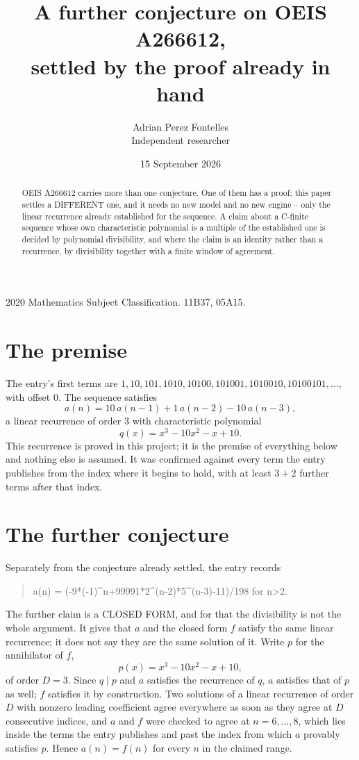 \documentclass[11pt,a4paper]{article}
\title{A further conjecture on OEIS A266612,\\ \large settled by the proof already in hand}
\author{Adrian Perez Fontelles\\ \small Independent researcher}
\date{15 September 2026}
\theoremstyle{plain}
\theoremstyle{definition}
\begin{document}
\maketitle

\begin{abstract}
OEIS A266612 carries more than one conjecture. One of them has a proof; this paper settles a
DIFFERENT one, and it needs no new model and no new engine -- only the linear recurrence already
established for the sequence. A claim about a C-finite sequence whose own characteristic
polynomial is a multiple of the established one is decided by polynomial divisibility, and where
the claim is an identity rather than a recurrence, by divisibility together with a finite window
of agreement.
\end{abstract}

\noindent\small 2020 Mathematics Subject Classification. 11B37, 05A15.\normalsize

\section{The premise}

The entry's first terms are $1, 10, 101, 1010, 10100, 101001, 1010010, 10100101,\dots$, with offset $0$. The sequence satisfies
\[
  a(n)=10\,a(n-1) + 1\,a(n-2) - 10\,a(n-3) ,
\]
a linear recurrence of order $3$ with characteristic polynomial
\[
  q(x)=x^{3} - 10 x^{2} - x + 10 .
\]
This recurrence is proved in this project; it is the premise of everything below and nothing else is assumed.
It was confirmed against every term the entry publishes from the index where it begins to hold,
with at least $3+2$ further terms after that index.

\section{The further conjecture}

Separately from the conjecture already settled, the entry records

\begin{quote}\raggedright a(n) = (-9*(-1)\^{}n+99991*2\^{}(n-2)*5\^{}(n-3)-11)/198 for n>2.\end{quote}

The further claim is a CLOSED FORM, and for that the divisibility is not the whole argument. It
gives that $a$ and the closed form $f$ satisfy the same linear recurrence; it does not say they
are the same solution of it. Write $p$ for the annihilator of $f$,
\[
  p(x)=x^{3} - 10 x^{2} - x + 10 ,
\]
of order $D=3$. Since $q\mid p$ and $a$ satisfies the recurrence of $q$, $a$ satisfies that of
$p$ as well; $f$ satisfies it by construction. Two solutions of a linear recurrence of order $D$
with nonzero leading coefficient agree everywhere as soon as they agree at $D$ consecutive
indices, and $a$ and $f$ were checked to agree at $n=6,\dots,8$,
which lies inside the terms the entry publishes and past the index from which $a$ provably
satisfies $p$. Hence $a(n)=f(n)$ for every $n$ in the claimed range.
\end{document}
